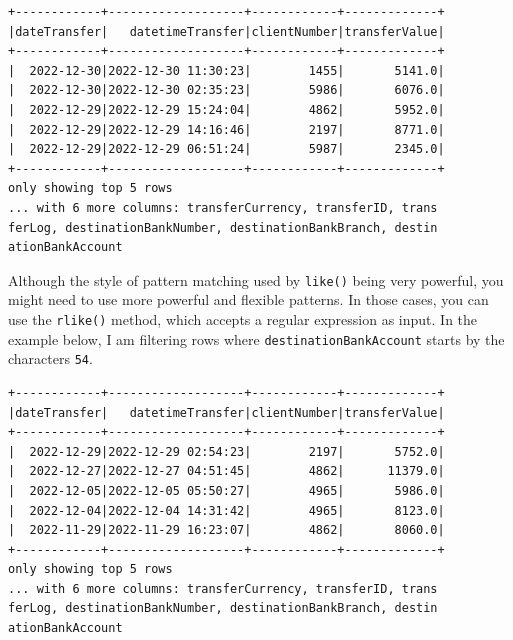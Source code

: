 \documentclass[
  11pt,
  letterpaper,
  DIV=11,
  numbers=noendperiod]{scrreprt}
\newenvironment{Shaded}{\begin{snugshade}}{\end{snugshade}}
\newcommand{\DecValTok}[1]{\textcolor[rgb]{0.68,0.00,0.00}{#1}}
\newcommand{\NormalTok}[1]{\textcolor[rgb]{0.00,0.23,0.31}{#1}}
\newcommand{\OperatorTok}[1]{\textcolor[rgb]{0.37,0.37,0.37}{#1}}
\newcommand{\SpecialCharTok}[1]{\textcolor[rgb]{0.37,0.37,0.37}{#1}}
\newcommand{\StringTok}[1]{\textcolor[rgb]{0.13,0.47,0.30}{#1}}
\begin{document}
\begin{verbatim}
+------------+-------------------+------------+-------------+
|dateTransfer|   datetimeTransfer|clientNumber|transferValue|
+------------+-------------------+------------+-------------+
|  2022-12-30|2022-12-30 11:30:23|        1455|       5141.0|
|  2022-12-30|2022-12-30 02:35:23|        5986|       6076.0|
|  2022-12-29|2022-12-29 15:24:04|        4862|       5952.0|
|  2022-12-29|2022-12-29 14:16:46|        2197|       8771.0|
|  2022-12-29|2022-12-29 06:51:24|        5987|       2345.0|
+------------+-------------------+------------+-------------+
only showing top 5 rows
... with 6 more columns: transferCurrency, transferID, trans
ferLog, destinationBankNumber, destinationBankBranch, destin
ationBankAccount
\end{verbatim}

Although the style of pattern matching used by \texttt{like()} being
very powerful, you might need to use more powerful and flexible
patterns. In those cases, you can use the \texttt{rlike()} method, which
accepts a regular expression as input. In the example below, I am
filtering rows where \texttt{destinationBankAccount} starts by the
characters \texttt{54}.

\begin{Shaded}
\end{Shaded}

\begin{verbatim}
+------------+-------------------+------------+-------------+
|dateTransfer|   datetimeTransfer|clientNumber|transferValue|
+------------+-------------------+------------+-------------+
|  2022-12-29|2022-12-29 02:54:23|        2197|       5752.0|
|  2022-12-27|2022-12-27 04:51:45|        4862|      11379.0|
|  2022-12-05|2022-12-05 05:50:27|        4965|       5986.0|
|  2022-12-04|2022-12-04 14:31:42|        4965|       8123.0|
|  2022-11-29|2022-11-29 16:23:07|        4862|       8060.0|
+------------+-------------------+------------+-------------+
only showing top 5 rows
... with 6 more columns: transferCurrency, transferID, trans
ferLog, destinationBankNumber, destinationBankBranch, destin
ationBankAccount
\end{verbatim}
\end{document}

